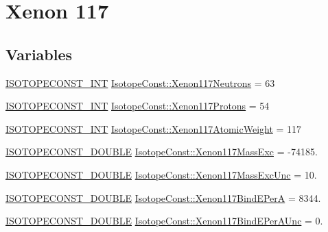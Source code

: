 \hypertarget{group___isotope_const-_xenon-_xe117}{}\section{Xenon 117}
\label{group___isotope_const-_xenon-_xe117}
\subsection*{Variables}
\begin{DoxyCompactItemize}
\item 
\mbox{\hyperlink{group___isotope_const-_macros_ga5f18360b3e99483a35c32d789e62621c}{I\+S\+O\+T\+O\+P\+E\+C\+O\+N\+S\+T\+\_\+\+I\+NT}} \mbox{\hyperlink{group___isotope_const-_xenon-_xe117_ga0b56ce1e893ba2016dbd75a2ed2c52f1}{Isotope\+Const\+::\+Xenon117\+Neutrons}} = 63
\item 
\mbox{\hyperlink{group___isotope_const-_macros_ga5f18360b3e99483a35c32d789e62621c}{I\+S\+O\+T\+O\+P\+E\+C\+O\+N\+S\+T\+\_\+\+I\+NT}} \mbox{\hyperlink{group___isotope_const-_xenon-_xe117_ga416310717771c3e1d975a97d3aa678a6}{Isotope\+Const\+::\+Xenon117\+Protons}} = 54
\item 
\mbox{\hyperlink{group___isotope_const-_macros_ga5f18360b3e99483a35c32d789e62621c}{I\+S\+O\+T\+O\+P\+E\+C\+O\+N\+S\+T\+\_\+\+I\+NT}} \mbox{\hyperlink{group___isotope_const-_xenon-_xe117_ga86eddec4dbd651d12638336e412f9eea}{Isotope\+Const\+::\+Xenon117\+Atomic\+Weight}} = 117
\item 
\mbox{\hyperlink{group___isotope_const-_macros_ga8f45a7272ce02c0b4c65c44636ed719a}{I\+S\+O\+T\+O\+P\+E\+C\+O\+N\+S\+T\+\_\+\+D\+O\+U\+B\+LE}} \mbox{\hyperlink{group___isotope_const-_xenon-_xe117_ga78c9b7effaed44a42cca752e9748326b}{Isotope\+Const\+::\+Xenon117\+Mass\+Exc}} = -\/74185.
\item 
\mbox{\hyperlink{group___isotope_const-_macros_ga8f45a7272ce02c0b4c65c44636ed719a}{I\+S\+O\+T\+O\+P\+E\+C\+O\+N\+S\+T\+\_\+\+D\+O\+U\+B\+LE}} \mbox{\hyperlink{group___isotope_const-_xenon-_xe117_ga5fa641b34e99d09f19fc79a037ec99e7}{Isotope\+Const\+::\+Xenon117\+Mass\+Exc\+Unc}} = 10.
\item 
\mbox{\hyperlink{group___isotope_const-_macros_ga8f45a7272ce02c0b4c65c44636ed719a}{I\+S\+O\+T\+O\+P\+E\+C\+O\+N\+S\+T\+\_\+\+D\+O\+U\+B\+LE}} \mbox{\hyperlink{group___isotope_const-_xenon-_xe117_ga915a48b0e2f1d1f2400475e6e8b67e69}{Isotope\+Const\+::\+Xenon117\+Bind\+E\+PerA}} = 8344.
\item 
\mbox{\hyperlink{group___isotope_const-_macros_ga8f45a7272ce02c0b4c65c44636ed719a}{I\+S\+O\+T\+O\+P\+E\+C\+O\+N\+S\+T\+\_\+\+D\+O\+U\+B\+LE}} \mbox{\hyperlink{group___isotope_const-_xenon-_xe117_gaf0e62a2f740ac85bfc33cde7a83ff39b}{Isotope\+Const\+::\+Xenon117\+Bind\+E\+Per\+A\+Unc}} = 0.

\end{DoxyCompactItemize}
